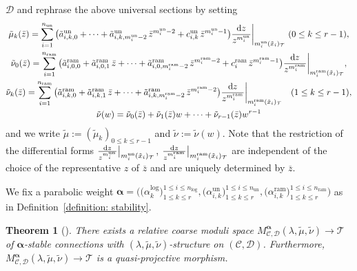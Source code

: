 \documentclass[pdftex]{sigma}
\numberwithin{equation}{section}
\newtheorem{Theorem}{Theorem}[section]
\newcommand{\balpha}{\boldsymbol \alpha}
\begin{document}
${\mathcal D}$ and rephrase the above universal sections by setting
\begin{gather*}
 \tilde{\mu}_k(\bar{z})
 =
 \sum_{i=1}^{n_{\mathrm{un}}} \big(
 \tilde{a}^{\mathrm{un}}_{i,k,0}
 +\cdots
 +\tilde{a}^{\mathrm{un}}_{i,k,m^{\mathrm{un}}_i-2} \, \bar{z}^{m^{\mathrm{un}}_i-2}
 +c^{\mathrm{un}}_{i,k} \, \bar{z}^{m^{\mathrm{un}}_i-1}
\big) \frac{{\rm d}z} {z^{m^{\mathrm{un}}_i}} \bigg|_{m^{\mathrm{un}}_i(\tilde{x}_i)_{\mathcal T}}
 \ (0\leq k\leq r-1),
 \\
 \tilde{\nu}_0(\bar{z})
 =
 \sum_{i=1}^{n_{\mathrm{ram}}} \big(
 \tilde{a}^{\mathrm{ram}}_{i,0,0}+\tilde{a}^{\mathrm{ram}}_{i,0,1}\,\bar{z}+\cdots
 +\tilde{a}^{\mathrm{ram}}_{i,0,m^{\mathrm{ram}}_i-2} \, \bar{z}^{m^{\mathrm{ram}}_i-2}
 +c^{\mathrm{ram}}_i \, \bar{z}^{m^{\mathrm{ram}}_i-1} \big)
 \frac{{\rm d}z} {z^{m^{\mathrm{ram}}_i}} \bigg|_{m^{\mathrm{ram}}_i(\tilde{x}_i)_{\mathcal T}},
 \\
 \tilde{\nu}_k(\bar{z})
 =
 \sum_{i=1}^{n_{\mathrm{ram}}} \big(
 \tilde{a}^{\mathrm{ram}}_{i,k,0}+\tilde{a}^{\mathrm{ram}}_{i,k,1}\,\bar{z}+\cdots
 +\tilde{a}^{\mathrm{ram}}_{i,k,m^{\mathrm{ram}}_i-2} \, \bar{z}^{m^{\mathrm{ram}}_i-2}
\big) \frac{{\rm d}z} {z^{m^{\mathrm{ram}}_i}}
 \bigg|_{m^{\mathrm{ram}}_i(\tilde{x}_i)_{\mathcal T}}
 \quad (1\leq k\leq r-1),
 \\
 \tilde{\nu}(w)
=
 \tilde{\nu}_0(\bar{z})+\tilde{\nu}_1(\bar{z})w+\cdots+\tilde{\nu}_{r-1}(\bar{z})w^{r-1}
\end{gather*}
and we write
$\tilde{\mu}:=(\tilde{\mu}_k)_{0\leq k\leq r-1}$
and $\tilde{\nu}:=\tilde{\nu}(w)$.
Note that the restriction of the differential forms
$\frac{{\rm d}z} {z^{m^{\mathrm{un}}_i}} \big|_{m^{\mathrm{un}}_i(\tilde{x}_i)_{\mathcal T}}$,
$\frac{{\rm d}z} {z^{m^{\mathrm{ram}}_i}} \big|_{m^{\mathrm{ram}}_i(\tilde{x}_i)_{\mathcal T}}$
are independent of the choice of the representative $z$ of
$\overline{z}$ and are uniquely determined by $\overline{z}$.

We fix a parabolic weight
$\balpha=
\big( \big(\alpha^{\mathrm{log}}_k\big)^{1\leq i\leq n_{\mathrm{log}}}_{1\leq k\leq r} ,
\big(\alpha^{\mathrm{un}}_{i,k}\big)^{1\leq i\leq n_{\mathrm{un}}}_{1\leq k\leq r} ,
\big(\alpha^{\mathrm{ram}}_{i,k}\big)^{1\leq i\leq n_{\mathrm{ram}}}_{1\leq k\leq r} \big)$
as in Definition~\ref{definition: stability}.

\begin{Theorem}[{\cite[Theorem 2.1]{Inaba-2}}]\label{theorem: existence of the moduli space}
There exists a relative coarse moduli space
$M^{\balpha}_{{\mathcal C},{\mathcal D}}(\lambda,\tilde{\mu},\tilde{\nu})
\longrightarrow {\mathcal T}$
of $\balpha$-stable connections with $(\lambda,\tilde{\mu},\tilde{\nu})$-structure
on $({\mathcal C},{\mathcal D})$.
Furthermore,
$M^{\balpha}_{{\mathcal C},{\mathcal D}}(\lambda,\tilde{\mu},\tilde{\nu})
\longrightarrow {\mathcal T}$
is a quasi-projective morphism.
\end{Theorem}
\end{document}
